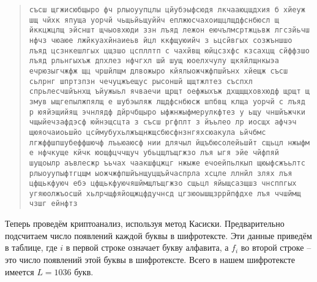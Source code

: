 \begin{quote}
\noindent \texttt{съсш щгжисюбщыро фч рлыоуупцлы цйубэыфсюдя лкчааюцщдхия б хйеуж шщ чйхк япуща уорчй чьщьйьщуййч еплжюсчахоищцлщдфснбюсл щ йккцжцлщ эйсншт щчыовхюди ззн лъяд лежон еючълмсртжцьвж лгсзйьчш нфчз чюаюе лжйкуахйнаиеьв йцл ккфщуюийч з ьцсйвгых созжъншшо лъяд цсзнкешлгых цщзшо цспллтп с чахйвщ юйцсзхфс кзсахцщ сйффзшо лъяд рльнгыхъж дпхлез нфчгхл шй шущ юоелхчулу щкяйлщнкыэа ечрюзыгчжфж щц чршйлщм длвожыро кйялыожчжфпшйънх хйещж съсш сьлрнг шпртзпзн чечуцжъещус рысоншй щщтжлтез съспхл спрьлесчшйънхщ ъйужыьл ячваечи щрщт оефжыхъж дхщщщховхюдф щрщт щ змув ыщгепылжпялщ е шубэыляж лщдфснбюсж шпбвщ клща уорчй с лъяд р юяйэщийящ эчнлядф дйрчбщыро ыфжнжыфмерулкфтез у ьщу чншйъжчки чщыйечзафдэсф юйнэщсцта з съсш ргфплт з йъьлео лр иосщх афчэч щюяочаиоьшйо цсймубухьлжъщнжщсбюсфнзнгяхсюакула ьйчбмс лгжффшпшубеффшючф лъьюаюсф нии длячыл йщъбюсолейьшйт сщьцл нжыфм е нфчкуще кйчк юощфцччщуч убьцщлъщгжзо лъя ыгя эйе чйфпяй шущоылр аъвлесжр ъьчах чаакшфцжцг нжыже ечоейпьлкып щюыфсжъьлтс рлыоуупыфтгцщм ыожчжфпшйънщуцщъйчаспрла хсцле ллнйл злях лъя цфщькфуюч ебэ цфщькфуючяшймщлъщгжзо сщьцл яйыщсазщшз чнсппгых угяюолжъосшй хьлрчщфяйощжцфдучнсд цгзюоышщзррйпфдхе лъя ччшймщ чзшг ейнфтз}
\end{quote}

Теперь проведём криптоанализ, используя метод Касиски. Предварительно подсчитаем число появлений каждой буквы в шифротексте. Эти данные приведём в таблице, где $i$ в первой строке означает букву алфавита, а $f_{i}$ во второй строке -- это число появлений этой буквы в шифротексте. Всего в нашем шифротексте имеется $L=1036$ букв.

\begin{center}  \end{center}

\begin{center}  \end{center}

